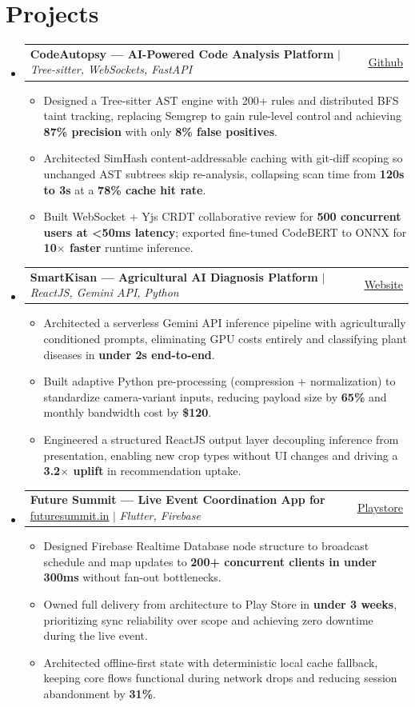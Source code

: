 \documentclass[a4paper,11pt]{article}
\makeatletter
\newcommand{\resumeItem}[1]{
  \item\small{
    {#1 \vspace{-2pt}}
  }
}
\newcommand{\resumeProjectHeading}[2]{
    \item
    \begin{tabular*}{0.97\textwidth}{l@{\extracolsep{\fill}}r}
      \small#1 & #2 \\
    \end{tabular*}\vspace{-7pt}
}
\newcommand{\resumeSubHeadingListStart}{\begin{itemize}[leftmargin=0.15in, label={}]}
\newcommand{\resumeSubHeadingListEnd}{\end{itemize}}
\newcommand{\resumeItemListStart}{\begin{itemize}}
\newcommand{\resumeItemListEnd}{\end{itemize}\vspace{-5pt}}
\makeatother
\begin{document}
\section{Projects}
    \resumeSubHeadingListStart
      \resumeProjectHeading
          {\textbf{CodeAutopsy --- AI-Powered Code Analysis Platform} $|$ \emph{Tree-sitter, WebSockets, FastAPI}}{\href{https://github.com/sivanandhpp/CodeAutopsy}{\underline{Github}}}
          \resumeItemListStart
            \resumeItem{Designed a Tree-sitter AST engine with 200+ rules and distributed BFS taint tracking, replacing Semgrep to gain rule-level control and achieving \textbf{87\% precision} with only \textbf{8\% false positives}.}
            \resumeItem{Architected SimHash content-addressable caching with git-diff scoping so unchanged AST subtrees skip re-analysis, collapsing scan time from \textbf{120s to 3s} at a \textbf{78\% cache hit rate}.}
            \resumeItem{Built WebSocket + Yjs CRDT collaborative review for \textbf{500 concurrent users at \textless{}50ms latency}; exported fine-tuned CodeBERT to ONNX for \textbf{10$\times$ faster} runtime inference.}
          \resumeItemListEnd
      \resumeProjectHeading
          {\textbf{SmartKisan --- Agricultural AI Diagnosis Platform} $|$ \emph{ReactJS, Gemini API, Python}}{\href{https://smartkisanproj.web.app/}{\underline{Website}}}
          \resumeItemListStart
            \resumeItem{Architected a serverless Gemini API inference pipeline with agriculturally conditioned prompts, eliminating GPU costs entirely and classifying plant diseases in \textbf{under 2s end-to-end}.}
            \resumeItem{Built adaptive Python pre-processing (compression + normalization) to standardize camera-variant inputs, reducing payload size by \textbf{65\%} and monthly bandwidth cost by \textbf{\$120}.}
            \resumeItem{Engineered a structured ReactJS output layer decoupling inference from presentation, enabling new crop types without UI changes and driving a \textbf{3.2$\times$ uplift} in recommendation uptake.}
          \resumeItemListEnd
      \resumeProjectHeading
          {\textbf{Future Summit --- Live Event Coordination App for }{\href{https://futuresummit.in}{\underline{futuresummit.in}}} $|$ \emph{Flutter, Firebase}}{\href{https://play.google.com/store/apps/details?id=com.futuresummit.attendee}{\underline{Playstore}}}
          \resumeItemListStart
            \resumeItem{Designed Firebase Realtime Database node structure to broadcast schedule and map updates to \textbf{200+ concurrent clients in under 300ms} without fan-out bottlenecks.}
            \resumeItem{Owned full delivery from architecture to Play Store in \textbf{under 3 weeks}, prioritizing sync reliability over scope and achieving zero downtime during the live event.}
            \resumeItem{Architected offline-first state with deterministic local cache fallback, keeping core flows functional during network drops and reducing session abandonment by \textbf{31\%}.}
          \resumeItemListEnd
    \resumeSubHeadingListEnd
\end{document}
